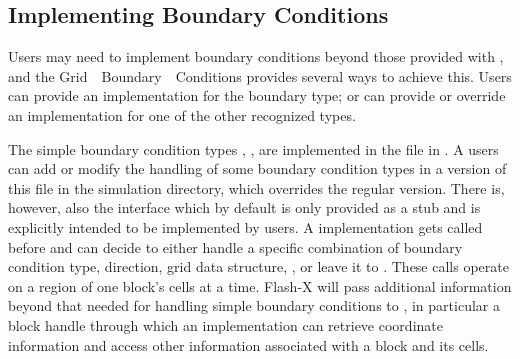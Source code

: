 \subsection{Implementing Boundary Conditions}

Users may need to implement boundary conditions
beyond those provided with \flashx, and the \unit{Grid\-Boundary\-Conditions} \subunit
provides several ways to achieve this.
Users can provide an implementation for the  boundary type;
or can provide or override an implementation for one of the other
recognized types.

The simple boundary condition types ,
,  are implemented in the
\newline
{} file in
.  A users can
add or modify the handling of some boundary condition
types in a version of this file in the simulation directory,
which overrides the regular version.  There is, however, also
the interface 
which by default is only provided as a stub and is
explicitly intended to be implemented by users.
\newline
A  implementation
gets called before 
and can decide to either handle a specific combination
of boundary condition type, direction, grid data structure, \etc,
or leave it to .
These calls operate on a region of one block's cells at a time.
Flash-X will pass additional information beyond that needed
for handling simple boundary conditions to 
, in particular
a block handle through which an implementation can
retrieve coordinate information and access
other information associated with a block and its cells.

